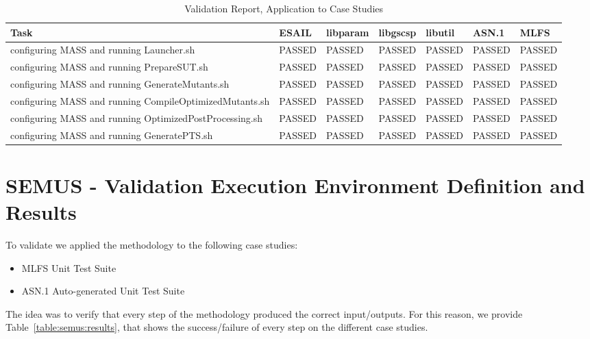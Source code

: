 \begin{table}[h]
\caption{\MASS Validation Report, Application to Case Studies}
\label{table:mass:results}
\scriptsize
\centering
\begin{tabular}{|l|l|l|l|l|l|l|}
\hline
\textbf{Task}&\textbf{ESAIL}&\textbf{libparam} &\textbf{libgscsp}&\textbf{libutil}&\textbf{ASN.1}&\textbf{MLFS}\\
\hline
configuring MASS and running Launcher.sh&PASSED&PASSED&PASSED&PASSED&PASSED&PASSED\\
configuring MASS and running PrepareSUT.sh&PASSED&PASSED&PASSED&PASSED&PASSED&PASSED\\
configuring MASS and running GenerateMutants.sh&PASSED&PASSED&PASSED&PASSED&PASSED&PASSED\\
configuring MASS and running CompileOptimizedMutants.sh&PASSED&PASSED&PASSED&PASSED&PASSED&PASSED\\
configuring MASS and running OptimizedPostProcessing.sh&PASSED&PASSED&PASSED&PASSED&PASSED&PASSED\\
configuring MASS and running GeneratePTS.sh &PASSED&PASSED&PASSED&PASSED&PASSED&PASSED\\
\hline
\end{tabular}

\end{table}



\chapter{SEMUS - Validation Execution Environment Definition and Results}

To validate \SEMUS we applied the methodology to the following case studies:

\begin{itemize}
  \item MLFS Unit Test Suite
  \item ASN.1 Auto-generated Unit Test Suite
\end{itemize}

The idea was to verify that every step of the methodology produced the correct input/outputs. For this reason, we provide Table~\ref{table:semus:results}, that shows the success/failure of every \SEMUS step on the different case studies.

